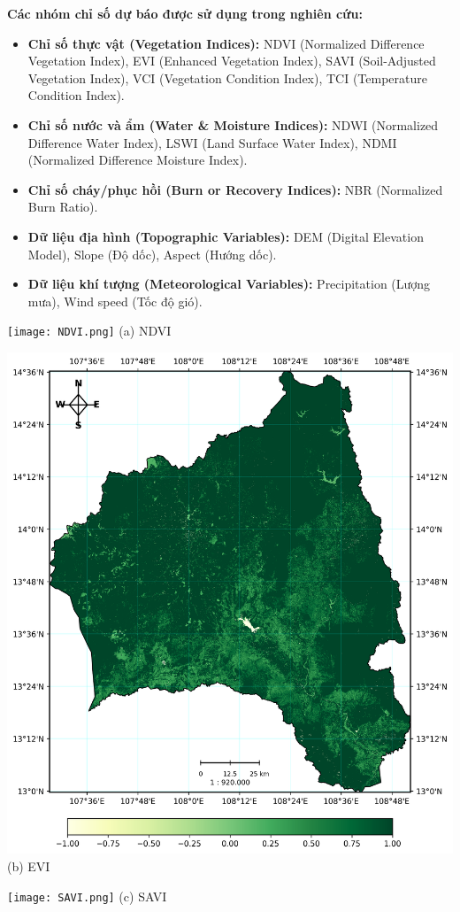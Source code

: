 \documentclass{article}
\begin{document}
\textbf{Các nhóm chỉ số dự báo được sử dụng trong nghiên cứu:}
\begin{itemize}
    \item \textbf{Chỉ số thực vật (Vegetation Indices):} NDVI (Normalized Difference Vegetation Index), EVI (Enhanced Vegetation Index), SAVI (Soil-Adjusted Vegetation Index), VCI (Vegetation Condition Index), TCI (Temperature Condition Index).
    \item \textbf{Chỉ số nước và ẩm (Water \& Moisture Indices):} NDWI (Normalized Difference Water Index), LSWI (Land Surface Water Index), NDMI (Normalized Difference Moisture Index).
    \item \textbf{Chỉ số cháy/phục hồi (Burn or Recovery Indices):} NBR (Normalized Burn Ratio).
    \item \textbf{Dữ liệu địa hình (Topographic Variables):} DEM (Digital Elevation Model), Slope (Độ dốc), Aspect (Hướng dốc).
    \item \textbf{Dữ liệu khí tượng (Meteorological Variables):} Precipitation (Lượng mưa), Wind speed (Tốc độ gió).
\end{itemize}

\noindent
\begin{minipage}{0.31\textwidth}
    \texttt{[image: NDVI.png]}
    \centering (a) NDVI
\end{minipage}%
\hfill
\begin{minipage}{0.31\textwidth}
    \includegraphics[width=\textwidth]{EVI.png}
    \centering (b) EVI
\end{minipage}%
\hfill
\begin{minipage}{0.31\textwidth}
    \texttt{[image: SAVI.png]}
    \centering (c) SAVI
\end{minipage}
\end{document}
